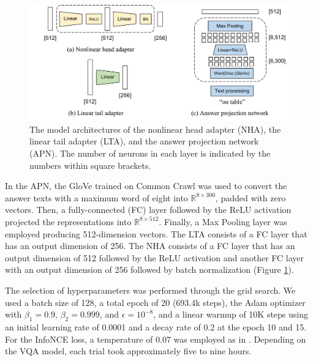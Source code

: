 \documentclass[letterpaper]{article} %
\begin{document}
\begin{figure}[!t]
    \centering
    \includegraphics[width=\linewidth]{figures/model_components.pdf}
    \caption{The model architectures of the nonlinear head adapter (NHA), the linear tail adapter (LTA), and the answer projection network (APN). The number of neurons in each layer is indicated by the numbers within square brackets.}
    \label{fig:arch}
\end{figure}

In the APN, the GloVe \cite{pennington2014glove} trained on Common Crawl was used to convert the answer texts with a maximum word of eight into $\mathbb{R}^{8\times 300}$, padded with zero vectors. Then, a fully-connected (FC) layer followed by the ReLU activation projected the representations into $\mathbb{R}^{8\times 512}$. Finally, a Max Pooling layer was employed producing 512-dimension vectors. The LTA consists of a FC layer that has an output dimension of 256. The NHA consists of a FC layer that has an output dimension of 512 followed by the ReLU activation and another FC layer with an output dimension of 256 followed by batch normalization (Figure \ref{fig:arch}). 

The selection of hyperparameters was performed through the grid search. We used a batch size of 128, a total epoch of 20 (693.4k steps), the Adam optimizer with $\beta_1=0.9$, $\beta_2=0.999$, and $\epsilon=10^{-8}$, and a linear warmup of 10K steps using an initial learning rate of 0.0001 and a decay rate of 0.2 at the epoch 10 and 15. For the InfoNCE loss, a temperature of 0.07 was employed as in \cite{patrick2020}. Depending on the VQA model, each trial took approximately five to nine hours.
\end{document}
